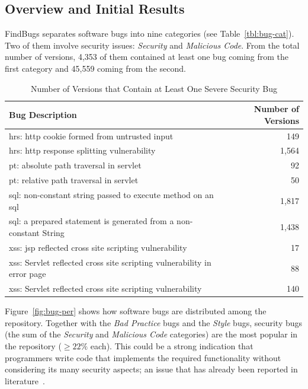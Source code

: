 \documentclass[conference]{llncs}
\begin{document}
\subsection{Overview and Initial Results}
\label{sec:overview}

FindBugs separates software bugs into nine categories (see
Table~\ref{tbl:bug-cat}). Two of them involve security issues: {\it Security} and {\it
Malicious Code}. From the total number of versions, 4,353 of them contained
at least one bug coming from the first category
and 45,559 coming from the second.

\begin{table}
\centering
\caption{Number of Versions that Contain at Least One Severe Security Bug}
\label{tbl:sev}
\leavevmode
	\begin{tabular}{l r}
	\hline
	Bug Description & Number of Versions\\
 	\hline
	{\sc hrs}: {\sc http} cookie formed from untrusted input & 149\\
	{\sc hrs}: {\sc http} response splitting vulnerability & 1,564\\
	{\sc pt}: absolute path traversal in servlet  & 92\\
	{\sc pt}: relative path traversal in servlet & 50\\
	{\sc sql}: non-constant string passed to execute method on an {\sc sql} & 1,817\\
	{\sc sql}: a prepared statement is generated from a non-constant String & 1,438\\
	{\sc xss}: {\sc jsp} reflected cross site scripting vulnerability & 17\\
	{\sc xss}: Servlet reflected cross site scripting vulnerability in error page & 88\\
	{\sc xss}: Servlet reflected cross site scripting vulnerability & 140\\
	\hline
	\end{tabular}
\end{table}

Figure~\ref{fig:bug-per} shows how software bugs are distributed among the
repository. Together with the {\it Bad Practice} bugs and the {\it Style} bugs,
security bugs (the sum of the {\it Security} and {\it Malicious Code}
categories) are the most popular in the repository ($\geq 22\%$ each).
This could be a strong indication that programmers write code
that implements the required functionality without considering its many
security aspects; an issue that has already been reported in
literature~\cite{SH09}.
\end{document}
